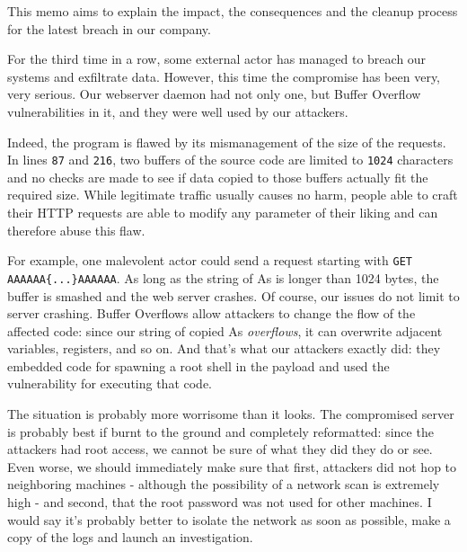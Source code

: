 \documentclass[paper=a4]{../../_global/texMemo}
\begin{document}
\maketitle

This memo aims to explain the impact, the consequences and the cleanup process for the latest breach in our company.

For the third time in a row, some external actor has managed to breach our systems and exfiltrate data. However, this time the compromise has been very, very serious. Our webserver daemon had not only one, but Buffer Overflow vulnerabilities in it, and they were well used by our attackers.

Indeed, the program is flawed by its mismanagement of the size of the requests. In lines \verb=87= and \verb=216=, two buffers of the source code are limited to \verb=1024= characters and no checks are made to see if data copied to those buffers actually fit the required size. While legitimate traffic usually causes no harm, people able to craft their HTTP requests are able to modify any parameter of their liking and can therefore abuse this flaw. 

For example, one malevolent actor could send a request starting with \verb=GET AAAAAA{...}AAAAAA=. As long as the string of As is longer than 1024 bytes, the buffer is smashed and the web server crashes. Of course, our issues do not limit to server crashing. Buffer Overflows allow attackers to change the flow of the affected code: since our string of copied As \textit{overflows}, it can overwrite adjacent variables, registers, and so on. And that's what our attackers exactly did: they embedded code for spawning a root shell in the payload and used the vulnerability for executing that code. 

The situation is probably more worrisome than it looks. The compromised server is probably best if burnt to the ground and completely reformatted: since the attackers had root access, we cannot be sure of what they did they do or see. Even worse, we should immediately make sure that first, attackers did not hop to neighboring machines - although the possibility of a network scan is extremely high - and second, that the root password was not used for other machines. I would say it's probably better to isolate the network as soon as possible, make a copy of the logs and launch an investigation.
\end{document}
